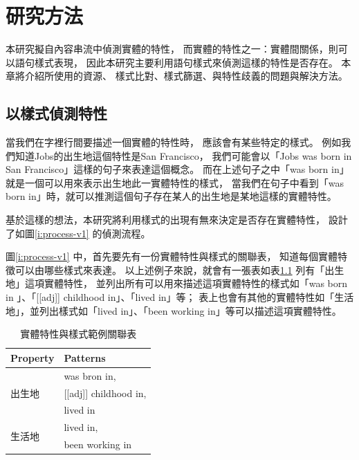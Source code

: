 %
%
%
\chapter{研究方法}
\label{c:method}

本研究擬自內容串流中偵測實體的特性，
而實體的特性之一：實體間關係，則可以語句樣式表現，
因此本研究主要利用語句樣式來偵測這樣的特性是否存在。
本章將介紹所使用的資源、
樣式比對、樣式篩選、與特性歧義的問題與解決方法。

\section{以樣式偵測特性}
當我們在字裡行間要描述一個實體的特性時，
應該會有某些特定的樣式。
例如我們知道Jobs的出生地這個特性是San Francisco，
我們可能會以「Jobs was born in San Francisco」這樣的句子來表達這個概念。
而在上述句子之中「was born in」就是一個可以用來表示出生地此一實體特性的樣式，
當我們在句子中看到「was born in」時，就可以推測這個句子存在某人的出生地是某地這樣的實體特性。

基於這樣的想法，本研究將利用樣式的出現有無來決定是否存在實體特性，
設計了如圖\ref{i:process-v1} 的偵測流程。

圖\ref{i:process-v1} 中，首先要先有一份實體特性與樣式的關聯表，
知道每個實體特徵可以由哪些樣式來表達。
以上述例子來說，就會有一張表如表\ref{t:ext} 列有「出生地」這項實體特性，
並列出所有可以用來描述這項實體特性的樣式如「was born in 」、「[[adj]] childhood in」、「lived in」等；
表上也會有其他的實體特性如「生活地」，並列出樣式如「lived in」、「been working in」等可以描述這項實體特性。

\begin{table}
    \caption{實體特性與樣式範例關聯表}
    \label{t:ext}
    \begin{center}
    \footnotesize
    \begin{tabular}{|l|l|}
        \hline
        Property & Patterns \\
        \hline
        \multirow{3}{*}{出生地} & was bron in, \\
         & [[adj]] childhood in, \\
         & lived in\\
        \hline
        \multirow{2}{*}{生活地} & lived in, \\
         & been working in\\
        \hline
    \end{tabular}
    \end{center}
\end{table}

